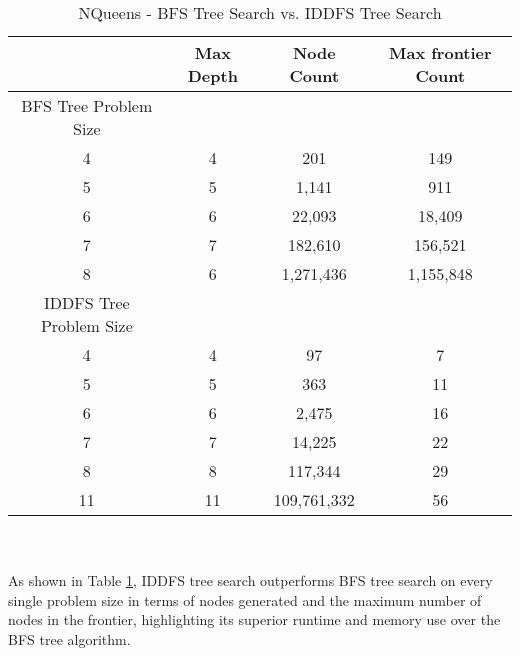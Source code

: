\documentclass[11pt]{article}
\begin{document}
\begin{table}[!h]
  \centering
  \caption{NQueens - BFS Tree Search vs. IDDFS Tree Search}
    \begin{tabular}{|c|c|c|c|}
    \hline
          & \textbf{Max Depth} & \textbf{Node Count} & \textbf{Max frontier Count} \\
    \hline
        BFS Tree Problem Size &       &       &         \\
    \hline
     4 & 4     & 201   & 149 \\
    5 & 5     & 1,141 & 911 \\
    6 & 6     & 22,093 & 18,409 \\
     7 & 7     & 182,610 & 156,521 \\
    8 & 6     & 1,271,436 & 1,155,848 \\
    \hline
     IDDFS Tree Problem Size &       &       &         \\
     \hline
    4 & 4     & 97    & 7 \\
    5 & 5     & 363   & 11 \\
    6 & 6     & 2,475 & 16 \\
    7 & 7     & 14,225 & 22 \\
    8 & 8     & 117,344 & 29 \\
    11 & 11    & 109,761,332 & 56 \\
        \hline

    \end{tabular}%
  \label{nqueens}%
\\~\\
  \vspace*{5mm}
As shown in Table \ref{nqueens}, IDDFS tree search outperforms BFS tree search on every single problem size in terms of nodes generated and the maximum number of nodes in the frontier, highlighting its  superior runtime and memory use over the BFS tree algorithm.
\end{table}%
\end{document}
